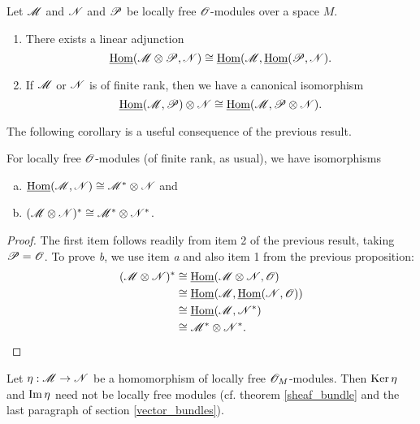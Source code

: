 \begin{proposition}\label{tensor_hom}
Let $\mathscr{M}$ and $\mathscr{N}$ and $\mathscr{P}$ be locally free $\mathscr{O}$-modules over a space $M$.
\begin{enumerate}
\item There exists a linear adjunction
$$\underline{\operatorname{Hom}}(\mathscr{M}\otimes \mathscr{P},\mathscr{N})\cong \underline{\operatorname{Hom}}(\mathscr{M},\underline{\operatorname{Hom}}(\mathscr{P},\mathscr{N}).$$ 
\item If $\mathscr{M}$ or $\mathscr{N}$ is of finite rank, then we have a canonical isomorphism
$$\underline{\operatorname{Hom}}(\mathscr{M},\mathscr{P})\otimes \mathscr{N}\cong \underline{\operatorname{Hom}}(\mathscr{M},\mathscr{P}\otimes \mathscr{N}).$$
\end{enumerate}
\end{proposition}

The following corollary is a useful consequence of the previous result.

\begin{cor}\label{tensor_hom_dual}
For locally free $\mathscr{O}$-modules (of finite rank, as usual), we have isomorphisms
\begin{enumerate}[a.]
\item $\underline{\operatorname{Hom}}(\mathscr{M},\mathscr{N})\cong \mathscr{M}^*\otimes \mathscr{N}$ and
\item $(\mathscr{M}\otimes \mathscr{N})^*\cong \mathscr{M}^*\otimes \mathscr{N}^*$.
\end{enumerate}
\end{cor}
\begin{proof}
The first item follows readily from item 2 of the previous result, taking $\mathscr{P}=\mathscr{O}$. To prove \emph{b}, we use item \emph{a} and also item 1 from the previous proposition:
$$
\begin{aligned}
(\mathscr{M}\otimes \mathscr{N})^* &\cong \underline{\operatorname{Hom}}(\mathscr{M}\otimes \mathscr{N},\mathscr{O}) \\
													 &\cong \underline{\operatorname{Hom}}(\mathscr{M},\underline{\operatorname{Hom}}(\mathscr{N},\mathscr{O})) \\
													 &\cong \underline{\operatorname{Hom}}(\mathscr{M},\mathscr{N}^*) \\
													 &\cong \mathscr{M}^*\otimes \mathscr{N}^*. \\
\end{aligned}
$$
\end{proof}

\begin{ej}
Let $\eta :\mathscr{M}\to \mathscr{N}$ be a homomorphism of locally free $\mathscr{O}_M$-modules. Then $\operatorname{Ker}\eta$ and $\operatorname{Im}\eta$ need not be locally free modules (cf. theorem \ref{sheaf_bundle} and the last paragraph of section \ref{vector_bundles}).
\end{ej}

